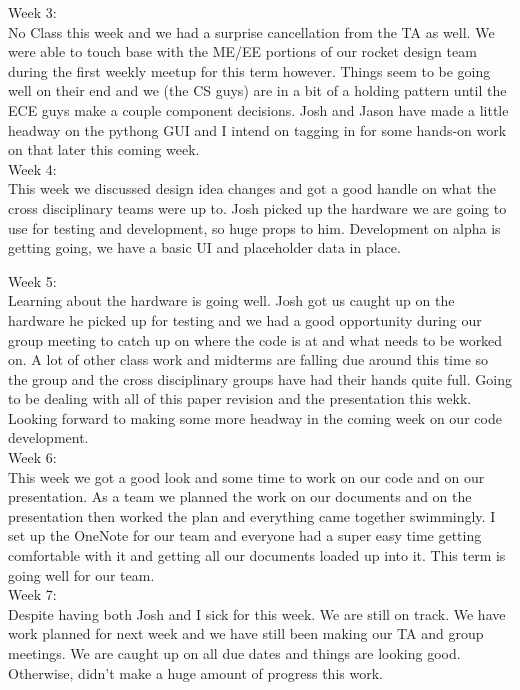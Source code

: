 \documentclass{article}
\begin{document}
Week 3:\\
No Class this week and we had a surprise cancellation from the TA as well. We were able to touch base with the ME/EE portions of our rocket design team during the first weekly meetup for this term however. Things seem to be going well on their end and we (the CS guys) are in a bit of a holding pattern until the ECE guys make a couple component decisions. Josh and Jason have made a little headway on the pythong GUI and I intend on tagging in for some hands-on work on that later this coming week.\\

Week 4:\\
This week we discussed design idea changes and got a good handle on what the cross disciplinary teams were up to. Josh picked up the hardware we are going to use for testing and development, so huge props to him. Development on alpha is getting going, we have a basic UI and placeholder data in place.

Week 5:\\
Learning about the hardware is going well. Josh got us caught up on the hardware he picked up for testing and we had a good opportunity during our group meeting to catch up on where the code is at and what needs to be worked on. A lot of other class work and midterms are falling due around this time so the group and the cross disciplinary groups have had their hands quite full. Going to be dealing with all of this paper revision and the presentation this wekk. Looking forward to making some more headway in the coming week on our code development.\\

Week 6:\\
This week we got a good look and some time to work on our code and on our presentation. As a team we planned the work on our documents and on the presentation then worked the plan and everything came together swimmingly. I set up the OneNote for our team and everyone had a super easy time getting comfortable with it and getting all our documents loaded up into it. This term is going well for our team.\\

Week 7:\\
Despite having both Josh and I sick for this week. We are still on track. We have work planned for next week and we have still been making our TA and group meetings. We are caught up on all due dates and things are looking good. Otherwise, didn't make a huge amount of progress this work.\\
\end{document}
